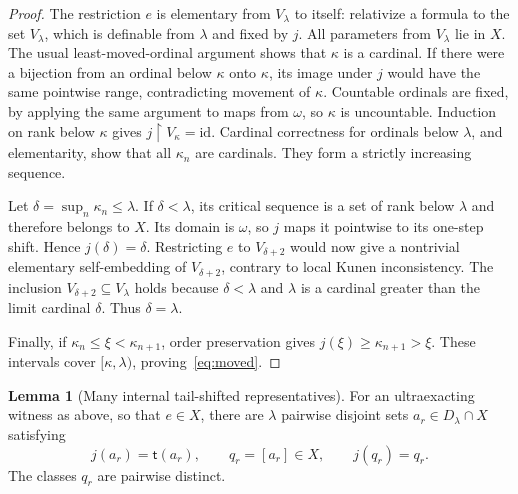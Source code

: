 \documentclass[11pt,letterpaper]{article}
\theoremstyle{definition}
\newtheorem{lemma}[definition]{Lemma}
\newcommand{\id}{\mathrm{id}}
\newcommand{\restr}{\mathbin{\upharpoonright}}
\newcommand{\Dlam}{D_\lambda}
\newcommand{\tail}{\mathsf t}
\begin{document}
\begin{proof}
The restriction $e$ is elementary from $V_\lambda$ to itself: relativize a formula to the set $V_\lambda$, which is definable from $\lambda$ and fixed by $j$. All parameters from $V_\lambda$ lie in $X$. The usual least-moved-ordinal argument shows that $\kappa$ is a cardinal. If there were a bijection from an ordinal below $\kappa$ onto $\kappa$, its image under $j$ would have the same pointwise range, contradicting movement of $\kappa$. Countable ordinals are fixed, by applying the same argument to maps from $\omega$, so $\kappa$ is uncountable. Induction on rank below $\kappa$ gives $j\restr V_\kappa=\id$. Cardinal correctness for ordinals below $\lambda$, and elementarity, show that all $\kappa_n$ are cardinals. They form a strictly increasing sequence.

Let $\delta=\sup_n\kappa_n\le\lambda$. If $\delta<\lambda$, its critical sequence is a set of rank below $\lambda$ and therefore belongs to $X$. Its domain is $\omega$, so $j$ maps it pointwise to its one-step shift. Hence $j(\delta)=\delta$. Restricting $e$ to $V_{\delta+2}$ would now give a nontrivial elementary self-embedding of $V_{\delta+2}$, contrary to local Kunen inconsistency. The inclusion $V_{\delta+2}\subseteq V_\lambda$ holds because $\delta<\lambda$ and $\lambda$ is a cardinal greater than the limit cardinal $\delta$. Thus $\delta=\lambda$.

Finally, if $\kappa_n\le\xi<\kappa_{n+1}$, order preservation gives $j(\xi)\ge\kappa_{n+1}>\xi$. These intervals cover $[\kappa,\lambda)$, proving~\eqref{eq:moved}.
\end{proof}

\begin{lemma}[Many internal tail-shifted representatives]\label{lem:orbits}
For an ultraexacting witness as above, so that $e\in X$, there are $\lambda$ pairwise disjoint sets $a_r\in\Dlam\cap X$ satisfying
\begin{equation}\label{eq:shifteda}
 j(a_r)=\tail(a_r),\qquad
 q_r=[a_r]\in X,\qquad j(q_r)=q_r.
\end{equation}
The classes $q_r$ are pairwise distinct.
\end{lemma}
\end{document}
